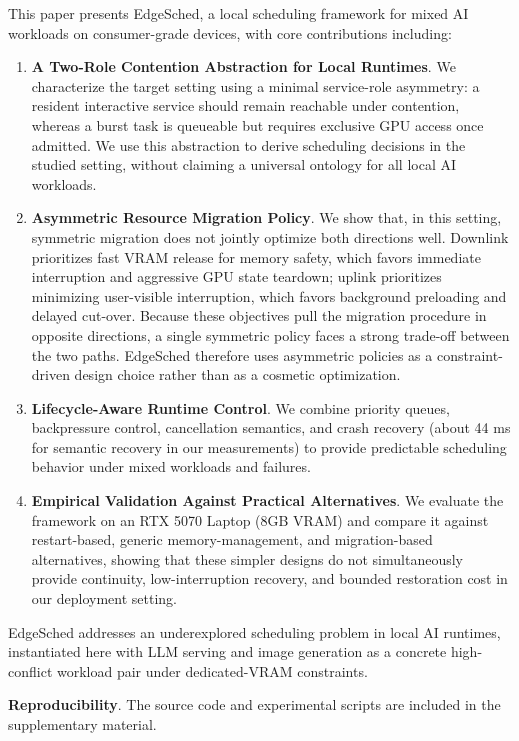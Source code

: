 This paper presents EdgeSched, a local scheduling framework for mixed AI workloads on consumer-grade devices, with core contributions including:

\begin{enumerate}
\item \textbf{A Two-Role Contention Abstraction for Local Runtimes}. We characterize the target setting using a minimal service-role asymmetry: a resident interactive service should remain reachable under contention, whereas a burst task is queueable but requires exclusive GPU access once admitted. We use this abstraction to derive scheduling decisions in the studied setting, without claiming a universal ontology for all local AI workloads.

\item \textbf{Asymmetric Resource Migration Policy}. We show that, in this setting, symmetric migration does not jointly optimize both directions well. Downlink prioritizes fast VRAM release for memory safety, which favors immediate interruption and aggressive GPU state teardown; uplink prioritizes minimizing user-visible interruption, which favors background preloading and delayed cut-over. Because these objectives pull the migration procedure in opposite directions, a single symmetric policy faces a strong trade-off between the two paths. EdgeSched therefore uses asymmetric policies as a constraint-driven design choice rather than as a cosmetic optimization.

\item \textbf{Lifecycle-Aware Runtime Control}. We combine priority queues, backpressure control, cancellation semantics, and crash recovery (about 44 ms for semantic recovery in our measurements) to provide predictable scheduling behavior under mixed workloads and failures.

\item \textbf{Empirical Validation Against Practical Alternatives}. We evaluate the framework on an RTX 5070 Laptop (8GB VRAM) and compare it against restart-based, generic memory-management, and migration-based alternatives, showing that these simpler designs do not simultaneously provide continuity, low-interruption recovery, and bounded restoration cost in our deployment setting.
\end{enumerate}

EdgeSched addresses an underexplored scheduling problem in local AI runtimes, instantiated here with LLM serving and image generation as a concrete high-conflict workload pair under dedicated-VRAM constraints.

\textbf{Reproducibility}. The source code and experimental scripts are included in the supplementary material.
